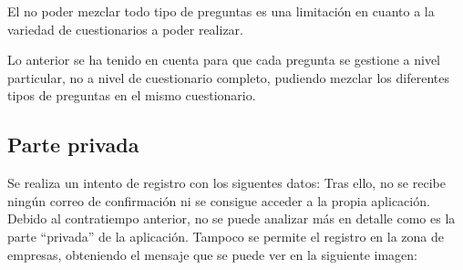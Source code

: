El no poder mezclar todo tipo de preguntas es una limitación en cuanto a la variedad de cuestionarios a poder realizar.

Lo anterior se ha tenido en cuenta para que cada pregunta se gestione a nivel particular, no a nivel de cuestionario completo, pudiendo mezclar los diferentes tipos de preguntas en el mismo cuestionario.

\subsection{Parte privada}
Se realiza un intento de registro con los siguentes datos:
Tras ello, no se recibe ningún correo de confirmación ni se consigue acceder a la propia aplicación.
Debido al contratiempo anterior, no se puede analizar más en detalle como es la parte ``privada'' de la aplicación.
\clearpage
Tampoco se permite el registro en la zona de empresas, obteniendo el mensaje que se puede ver en la siguiente imagen:





